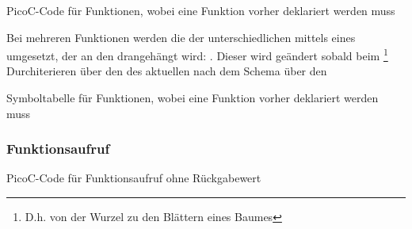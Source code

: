 \begin{code}
  \centering
  \caption{PicoC-Code für Funktionen, wobei eine Funktion vorher deklariert werden muss}
  \label{code:picoc_code_für_funktionen_picoc_code_für_funktionen_wobei_eine_funktion_vorher_deklariert_werden_muss}
\end{code}

Bei mehreren Funktionen werden die  der unterschiedlichen  mittels eines   umgesetzt, der an den   drangehängt wird: . Dieser  wird geändert sobald beim \footnote{D.h. von der Wurzel zu den Blättern eines Baumes} Durchiterieren über den  des aktuellen  nach dem  Schema über den

\begin{code}
  \centering
  \caption{Symboltabelle für Funktionen, wobei eine Funktion vorher deklariert werden muss}
  \label{code:symboltabelle_für_funktionen_picoc_code_für_funktionen_wobei_eine_funktion_vorher_deklariert_werden_muss}
\end{code}

\subsubsection{Funktionsaufruf}



\begin{code}
  \centering
  \caption{PicoC-Code für Funktionsaufruf ohne Rückgabewert}
  \label{code:picoc_code_für_funktionsaufruf_ohne_rückgabewert}
\end{code}

